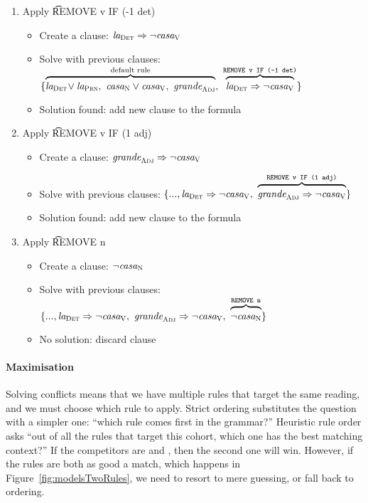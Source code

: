 \begin{enumerate}
\item Apply \t{REMOVE v IF (-1 det)}
 \begin{itemize}
    \item Create a clause: $\text{\em la}_{\text{\sc Det}} \Rightarrow \neg \text{\em casa}_{\text{\sc V}}$
    \item Solve with previous clauses:
  $\{ \ob{\laDet \! \vee \laPrn, \ \casaN \vee \casaV, \  \grandeAdj}^{\text{default rule}}, \ 
      \ob{\laDet \Rightarrow \neg \casaV}^{\t{REMOVE v IF (-1 det)}} \}$
    \item Solution found: add new clause to the formula
 \end{itemize}
\item Apply \t{REMOVE v IF (1 adj)} 
 \begin{itemize}
    \item Create a clause: $\text{\em grande}_{\text{\sc Adj}} \Rightarrow \neg \text{\em casa}_{\text{\sc V}}$
    \item Solve with previous clauses:
  $\{..., \laDet \Rightarrow \neg \casaV, \ 
      \ob{\grandeAdj \Rightarrow \neg \casaV}^{\t{REMOVE v IF (1 adj)}}  \}$
    \item Solution found: add new clause to the formula
 \end{itemize}
\item Apply \t{REMOVE n}
 \begin{itemize}
    \item Create a clause: $\neg \text{\em casa}_{\text{\sc N}}$
    \item Solve with previous clauses:
      $\{ ..., \laDet \Rightarrow \neg \casaV, \ 
      \grandeAdj \Rightarrow \neg \casaV, \ 
      \ob{\neg \casaN}^{\t{REMOVE n}} \}$
    \item No solution: discard clause
 \end{itemize}
\end{enumerate}







\paragraph{Maximisation} 

Solving conflicts means that we have multiple rules that target the same reading, and we must choose which rule to apply.
Strict ordering substitutes the question with a simpler one: ``which rule comes first in the grammar?''
Heuristic rule order asks ``out of all the rules that target this cohort, which one has the best matching context?''
If the competitors are  and , then the second one will win. However, if the rules are both as good a match, which happens in Figure~\ref{fig:modelsTwoRules}, we need to resort to mere guessing, or fall back to ordering.


